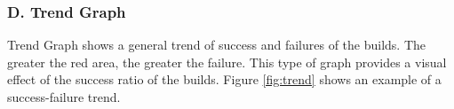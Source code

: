 \documentclass[10pt]{ruthesis}
\begin{document}

\subsubsection{\textbf{D. Trend Graph}}
Trend Graph shows a general trend of success and failures of the builds. The greater the red area, the greater the failure. This type of graph provides a visual effect of the success ratio of the builds. Figure \ref{fig:trend} shows an example of a success-failure trend.
\end{document}
